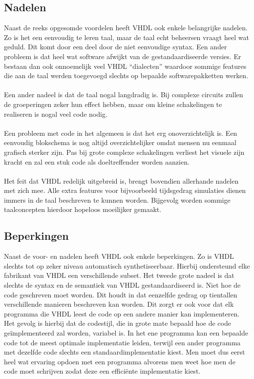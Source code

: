 \subsection{Nadelen}
Naast de reeks opgesomde voordelen heeft VHDL ook enkele belangrijke nadelen. Zo is het een eenvoudig te leren taal, maar de taal echt beheersen vraagt heel wat geduld. Dit komt door een deel door de niet eenvoudige syntax. Een ander probleem is dat heel wat software afwijkt van de gestandaardiseerde versies. Er bestaan dan ook onnoemelijk veel VHDL ``dialecten'' waardoor sommige features die aan de taal werden toegevoegd slechts op bepaalde softwarepakketten werken.
\paragraph{}
Een ander nadeel is dat de taal nogal langdradig is. Bij complexe circuits zullen de groeperingen zeker hun effect hebben, maar om kleine schakelingen te realiseren is nogal veel code nodig.
\paragraph{}
Een probleem met code in het algemeen is dat het erg onoverzichtelijk is. Een eenvoudig blokschema is nog altijd overzichtelijker omdat mensen nu eenmaal grafisch sterker zijn. Pas bij grote complexe schakelingen verliest het visuele zijn kracht en zal een stuk code als doeltreffender worden aanzien.
\paragraph{}
Het feit dat VHDL redelijk uitgebreid is, brengt bovendien allerhande nadelen met zich mee. Alle extra features voor bijvoorbeeld tijdsgedrag simulaties dienen immers in de taal beschreven te kunnen worden. Bijgevolg worden sommige taalconcepten hierdoor hopeloos moeilijker gemaakt.
\subsection{Beperkingen}
Naast de voor- en nadelen heeft VHDL ook enkele beperkingen. Zo is VHDL slechts tot op zeker niveau automatisch synthetiseerbaar. Hierbij ondersteund elke fabrikant van VHDL een verschillende subset. Het tweede grote nadeel is dat slechts de syntax en de semantiek van VHDL gestandaardiseerd is. Niet hoe de code geschreven moet worden. Dit houdt in dat eenzelfde gedrag op tientallen verschillende manieren beschreven kan worden. Dit zorgt er ook voor dat elk programma die VHDL leest de code op een andere manier kan implementeren. Het gevolg is hierbij dat de codestijl, die in grote mate bepaald hoe de code ge\"implementeerd zal worden, variabel is. In het ene programma kan een bepaalde code tot de meest optimale implementatie leiden, terwijl een ander programma met dezelfde code slechts een standaardimplementatie kiest. Men moet dus eerst heel wat ervaring opdoen met een programma alvorens men weet hoe men de code moet schrijven zodat deze een effici\"ente implementatie kiest.
